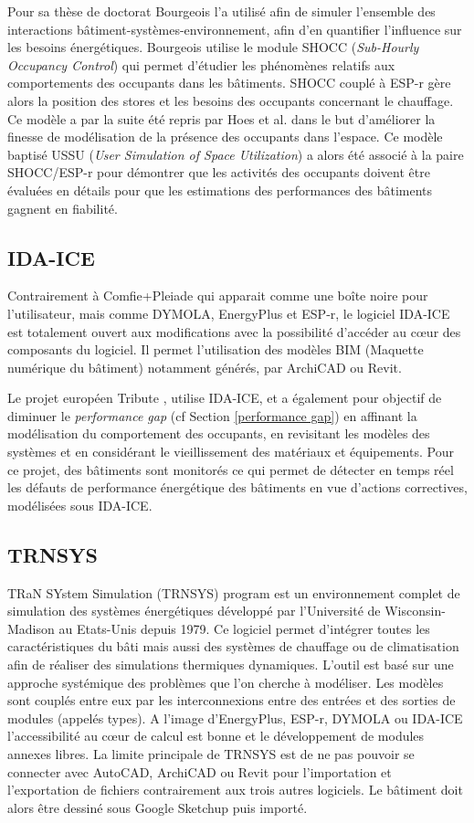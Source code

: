 Pour sa thèse de doctorat Bourgeois \cite{Bourgeois-05} l'a utilisé afin de simuler l'ensemble des interactions bâtiment-systèmes-environnement, afin d'en quantifier l'influence sur les besoins énergétiques. Bourgeois utilise le module SHOCC (\textit{Sub-Hourly Occupancy Control}) qui permet d'étudier les phénomènes relatifs aux comportements des occupants dans les bâtiments. SHOCC couplé à ESP-r gère alors la position des stores et les besoins des occupants concernant le chauffage. Ce modèle a par la suite été repris par Hoes et al. \cite{Hoes-09} dans le but d'améliorer la finesse de modélisation de la présence des occupants dans l'espace. Ce modèle baptisé USSU (\textit{User Simulation of Space Utilization}) a alors été associé à la paire SHOCC/ESP-r pour démontrer que les activités des occupants doivent être évaluées en détails pour que les estimations des performances des bâtiments gagnent en fiabilité.

\subsection*{IDA-ICE}

Contrairement à Comfie+Pleiade qui apparait comme une boîte noire pour l'utilisateur, mais comme DYMOLA, EnergyPlus et ESP-r, le logiciel IDA-ICE est totalement ouvert aux modifications avec la possibilité d'accéder au cœur des composants du logiciel. Il permet l'utilisation des modèles BIM (Maquette numérique du bâtiment) notamment générés, par ArchiCAD ou Revit.

Le projet européen Tribute \cite{TRIBUTE-15}, utilise IDA-ICE, et a également pour objectif de diminuer le \textit{performance gap} (cf Section \ref{performance gap}) en affinant la modélisation du comportement des occupants, en revisitant les modèles des systèmes et en considérant le vieillissement des matériaux et équipements. Pour ce projet, des bâtiments sont monitorés ce qui permet de détecter en temps réel les défauts de performance énergétique des bâtiments en vue d'actions correctives, modélisées sous IDA-ICE.

\subsection*{TRNSYS}

TRaN SYstem Simulation (TRNSYS) program est un environnement complet de simulation des systèmes énergétiques développé par l'Université de Wisconsin-Madison au Etats-Unis depuis 1979. Ce logiciel permet d'intégrer toutes les caractéristiques du bâti mais aussi des systèmes de chauffage ou de climatisation afin de réaliser des simulations thermiques dynamiques. L'outil est basé sur une approche systémique des problèmes que l'on cherche à modéliser. Les modèles sont couplés entre eux par les interconnexions entre des entrées et des sorties de modules (appelés types). A l'image d'EnergyPlus, ESP-r, DYMOLA ou IDA-ICE l'accessibilité au cœur de calcul est bonne et le développement de modules annexes libres. La limite principale de TRNSYS est de ne pas pouvoir se connecter avec AutoCAD, ArchiCAD ou Revit pour l'importation et l'exportation de fichiers contrairement aux trois autres logiciels. Le bâtiment doit alors être dessiné sous Google Sketchup puis importé.

